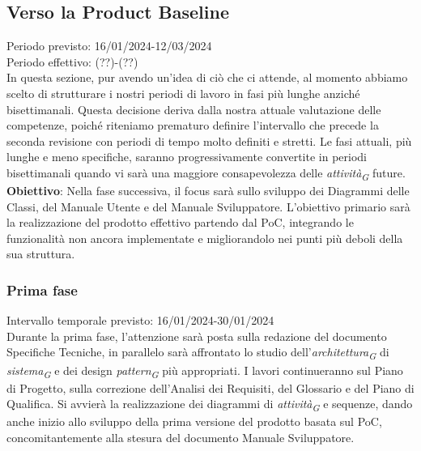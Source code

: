 \subsection{Verso la Product Baseline}
Periodo previsto: 16/01/2024-12/03/2024\\ 
\vspace{0.2cm} 
Periodo effettivo: (??)-(??)\\ 
\vspace{0.2cm} 
In questa sezione, pur avendo un'idea di ciò che ci attende, al momento abbiamo scelto di strutturare i nostri periodi di lavoro in fasi più lunghe anziché bisettimanali. Questa decisione deriva dalla nostra attuale valutazione delle competenze, poiché riteniamo prematuro definire l'intervallo che precede la seconda revisione con periodi di tempo molto definiti e stretti. 
Le fasi attuali, più lunghe e meno specifiche, saranno progressivamente convertite in periodi bisettimanali quando vi sarà una maggiore consapevolezza delle \textit{attività}\textsubscript{\textit{G}} future.
\\ 
\vspace{0.2cm} 
\textbf{Obiettivo}: Nella fase successiva, il focus sarà sullo sviluppo dei Diagrammi delle Classi, del Manuale Utente e del Manuale Sviluppatore. L'obiettivo primario sarà la realizzazione del prodotto effettivo partendo dal PoC, integrando le funzionalità non ancora implementate e migliorandolo nei punti più deboli della sua struttura.\\ 
\vspace{0.2cm} 

\subsubsection{Prima fase}
Intervallo temporale previsto: 16/01/2024-30/01/2024\\ 
\vspace{0.2cm} 
Durante la prima fase, l'attenzione sarà posta sulla redazione del documento Specifiche Tecniche, in parallelo sarà affrontato lo studio dell'\textit{architettura}\textsubscript{\textit{G}} di \textit{sistema}\textsubscript{\textit{G}} e dei design \textit{pattern}\textsubscript{\textit{G}} più appropriati. I lavori continueranno sul Piano di Progetto, sulla correzione dell'Analisi dei Requisiti, del Glossario e del Piano di Qualifica. Si avvierà la realizzazione dei diagrammi di \textit{attività}\textsubscript{\textit{G}} e sequenze, dando anche inizio allo sviluppo della prima versione del prodotto basata sul PoC, concomitantemente alla stesura del documento Manuale Sviluppatore.

